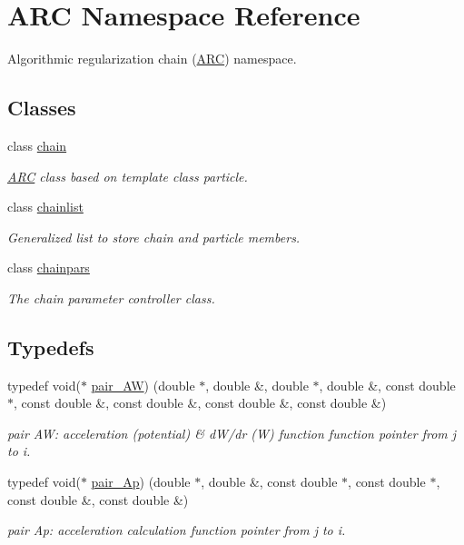 \hypertarget{namespaceARC}{}\section{A\+RC Namespace Reference}
\label{namespaceARC}


Algorithmic regularization chain (\hyperlink{namespaceARC}{A\+RC}) namespace.  


\subsection*{Classes}
\begin{DoxyCompactItemize}
\item 
class \hyperlink{classARC_1_1chain}{chain}
\begin{DoxyCompactList}\small\item\em \hyperlink{namespaceARC}{A\+RC} class based on template class particle. \end{DoxyCompactList}\item 
class \hyperlink{classARC_1_1chainlist}{chainlist}
\begin{DoxyCompactList}\small\item\em Generalized list to store chain and particle members. \end{DoxyCompactList}\item 
class \hyperlink{classARC_1_1chainpars}{chainpars}
\begin{DoxyCompactList}\small\item\em The chain parameter controller class. \end{DoxyCompactList}\end{DoxyCompactItemize}
\subsection*{Typedefs}
\begin{DoxyCompactItemize}
\item 
typedef void($\ast$ \hyperlink{namespaceARC_adbfc7c72ce3d25363148027db0641abf}{pair\+\_\+\+AW}) (double $\ast$, double \&, double $\ast$, double \&, const double $\ast$, const double \&, const double \&, const double \&, const double \&)
\begin{DoxyCompactList}\small\item\em pair AW\+: acceleration (potential) \& d\+W/dr (W) function function pointer from j to i. \end{DoxyCompactList}\item 
typedef void($\ast$ \hyperlink{namespaceARC_a819446c4644b3a3af7ef11574d0b55e0}{pair\+\_\+\+Ap}) (double $\ast$, double \&, const double $\ast$, const double $\ast$, const double \&, const double \&)
\begin{DoxyCompactList}\small\item\em pair Ap\+: acceleration calculation function pointer from j to i. \end{DoxyCompactList}\end{DoxyCompactItemize}
